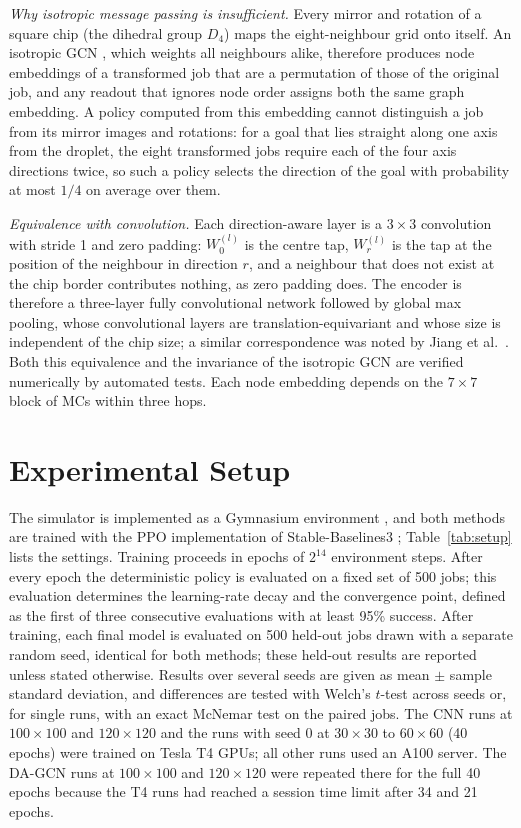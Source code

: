 \documentclass[conference,onecolumn,11pt]{IEEEtran}
\begin{document}
\textit{Why isotropic message passing is insufficient.} Every mirror and rotation of a square
chip (the dihedral group $D_4$) maps the eight-neighbour grid onto itself. An isotropic GCN
\cite{kipf2017}, which weights all neighbours alike, therefore produces node embeddings of a
transformed job that are a permutation of those of the original job, and any readout that
ignores node order assigns both the same graph embedding. A policy computed from this
embedding cannot distinguish a job from its mirror images and rotations: for a goal that
lies straight along one axis from the droplet, the eight transformed jobs require each of the
four axis directions twice, so such a policy selects the direction of the goal with
probability at most $1/4$ on average over them.

\textit{Equivalence with convolution.} Each direction-aware layer is a $3\times3$
convolution with stride 1 and zero padding: $W_0^{(l)}$ is the centre tap, $W_r^{(l)}$ is
the tap at the position of the neighbour in direction $r$, and a neighbour that does not
exist at the chip border contributes nothing, as zero padding does. The encoder is
therefore a three-layer fully convolutional network followed by global max pooling, whose
convolutional layers are translation-equivariant and whose size is independent of the chip
size; a similar correspondence was
noted by Jiang et al.\ \cite{jiang2021}. Both this equivalence and the invariance of the
isotropic GCN are verified numerically by automated tests. Each node embedding depends on
the $7\times7$ block of MCs within three hops.

\section{Experimental Setup}
The simulator is implemented as a Gymnasium environment \cite{towers2024}, and both methods
are trained with the PPO implementation of Stable-Baselines3 \cite{raffin2021};
Table~\ref{tab:setup} lists the settings. Training proceeds in epochs of $2^{14}$
environment steps. After every epoch the deterministic policy is evaluated on a fixed set of
500 jobs; this evaluation determines the learning-rate decay and the convergence point,
defined as the first of three consecutive evaluations with at least 95\% success. After
training, each final model is evaluated on 500 held-out jobs drawn with a separate random
seed, identical for both methods; these held-out results are reported unless stated
otherwise. Results over several seeds are given as mean $\pm$ sample standard deviation, and
differences are tested with Welch's $t$-test across seeds or, for single runs, with an
exact McNemar test on the paired jobs. The CNN runs at $100\times100$ and $120\times120$
and the runs with seed 0 at $30\times30$ to $60\times60$ (40 epochs) were trained on Tesla
T4 GPUs; all other runs used an A100 server. The DA-GCN runs at $100\times100$ and
$120\times120$ were repeated there for the full 40 epochs because the T4 runs had reached a
session time limit after 34 and 21 epochs.
\end{document}
